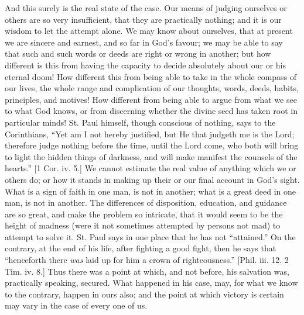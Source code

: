 And this surely is the real state of the case. Our means of judging
ourselves or others are so very insufficient, that they are
practically nothing; and it is our wisdom to let the attempt alone. We
may know about ourselves, that at present we are sincere and earnest,
and so far in God's favour; we may be able to say that such and such
words or deeds are right or wrong in another; but how different is
this from having the capacity to decide absolutely about our or his
eternal doom! How different this from being able to take in the whole
compass of our lives, the whole range and complication of our
thoughts, words, deeds, habits, principles, and motives! How different
from being able to argue from what we see to what God knows, or from
discerning whether the divine seed has taken root in particular minds!
St. Paul himself, though conscious of nothing, says to the
Corinthians, ``Yet am I not hereby justified, but He that judgeth
me is the Lord; therefore judge nothing before the time, until the
Lord come, who both will bring to light the hidden things of darkness,
and will make manifest the counsels of the hearts.'' [1 Cor. iv.
5.] We cannot estimate the real value of anything which we or others
do; or how it stands in making up their or our final account in God's
sight. What is a sign of faith in one man, is not in another; what is
a great deed in one man, is not in another. The differences of
disposition, education, and guidance are so great, and make the
problem so intricate, that it would seem to be the height of madness
(were it not sometimes attempted by persons not mad) to attempt to
solve it. St. Paul says in one place that he has not
``attained.'' On the contrary, at the end of his life, after
fighting a good fight, then he says that ``henceforth there \emph{was}
laid up for him a crown of righteousness.'' [Phil. iii. 12. 2 Tim.
iv. 8.] Thus there was a point at which, and not before, his salvation
was, practically speaking, secured. What happened in his case, may,
for what we know to the contrary, happen in ours also; and the point
at which victory is certain may vary in the case of every one of us.

